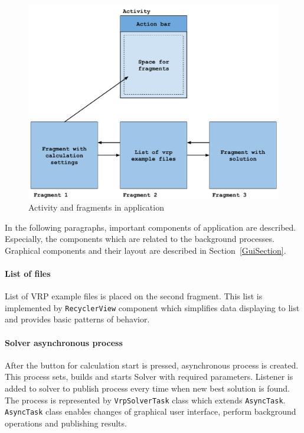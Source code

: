 \begin{figure}[h!]
    \centering
    \includegraphics[scale=0.7]{fig/act_frag.pdf}
    \caption{Activity and fragments in application}
    \label{ActivityFragmentsFigure}
\end{figure}

In the following paragraphs, important components of application are described. Especially, the components which are
related to the background processes. Graphical components and their layout are described in Section~\ref{GuiSection}.

\paragraph{List of files}
List of VRP example files is placed on the second fragment. This list is implemented by \texttt{RecyclerView} component
which simplifies data displaying to list and provides basic patterns of behavior.

\paragraph{Solver asynchronous process}
After the button for calculation start is pressed, asynchronous process is created. This process sets, builds and starts
Solver with required parameters. Listener is added to solver to publish process every time when new best solution is
found. The process is represented by \texttt{VrpSolverTask} class which extends \texttt{AsyncTask}. \texttt{AsyncTask}
class enables changes of graphical user interface, perform background operations and publishing results.

